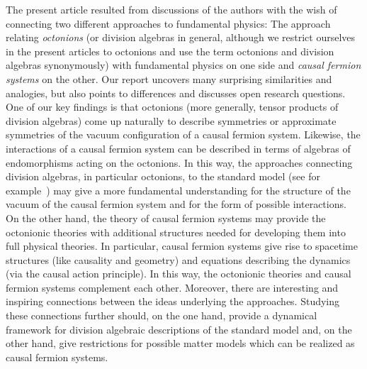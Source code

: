 \documentclass[reqno,11pt]{amsart}
\numberwithin{equation}{section}
\newcommand{\1}{\mbox{\rm 1 \hspace{-1.05 em} 1}}
\begin{document}
The present article resulted from discussions of the authors with the wish of connecting
two different approaches to fundamental physics:
The approach relating {\em{octonions}} (or division algebras in general, although we restrict ourselves in the present articles to octonions and use the term octonions and division algebras synonymously) with fundamental physics on one side and
{\em{causal fermion systems}} on the other. Our report uncovers many surprising similarities and analogies, but also
points to differences and discusses open research questions.
One of our key findings is that octonions (more generally, tensor products of division algebras) come up naturally to describe symmetries or approximate
symmetries of the vacuum configuration of a causal fermion system.
Likewise, the interactions of a causal fermion system can be described in terms of
algebras of endomorphisms acting on the octonions.
In this way, the approaches connecting division algebras, in particular octonions, to the standard model
(see for example~\cite{dixon2013division,furey2016standard,todorov-dubois-violette,manogue-dray-wilson}) may give a more fundamental understanding for the structure of the vacuum of the
causal fermion system and for the form of possible interactions.
On the other hand, the theory of causal fermion systems may provide the octonionic theories
with additional structures needed for developing them into full physical theories.
In particular, causal fermion systems give rise to spacetime structures (like causality and geometry)
and equations describing the dynamics (via the causal action principle).
In this way, the octonionic theories and causal fermion systems complement each other.
Moreover, there are interesting and inspiring connections between the ideas
underlying the approaches. Studying these connections further should, on the one hand, provide
a dynamical framework for division algebraic descriptions of the standard model
and, on the other hand, give restrictions for possible matter models which can be realized as causal fermion systems.
\end{document}
